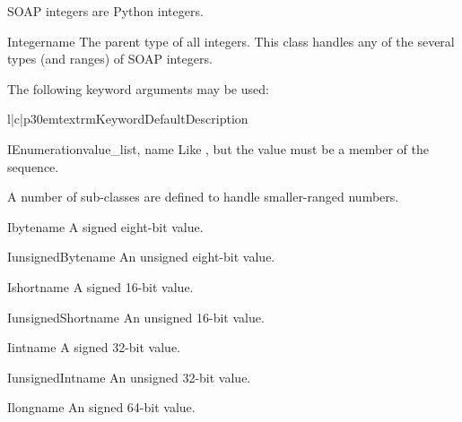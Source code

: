 SOAP integers are Python integers.

\begin{classdesc}{Integer}{name}
The parent type of all integers.
This class handles any of the several types (and ranges) of SOAP integers.

The following keyword arguments may be used:

\begin{tableiii}{l|c|p{30em}}{textrm}{Keyword}{Default}{Description}
\end{tableiii}
\end{classdesc}

\begin{classdesc}{IEnumeration}{value_list, name}
Like , but the value must be a member of
the  sequence.
\end{classdesc}

A number of sub-classes are defined to handle smaller-ranged numbers.

\begin{classdesc}{Ibyte}{name}
A signed eight-bit value.
\end{classdesc}

\begin{classdesc}{IunsignedByte}{name}
An unsigned eight-bit value.
\end{classdesc}

\begin{classdesc}{Ishort}{name}
A signed 16-bit value.
\end{classdesc}

\begin{classdesc}{IunsignedShort}{name}
An unsigned 16-bit value.
\end{classdesc}

\begin{classdesc}{Iint}{name}
A signed 32-bit value.
\end{classdesc}

\begin{classdesc}{IunsignedInt}{name}
An unsigned 32-bit value.
\end{classdesc}

\begin{classdesc}{Ilong}{name}
An signed 64-bit value.
\end{classdesc}

